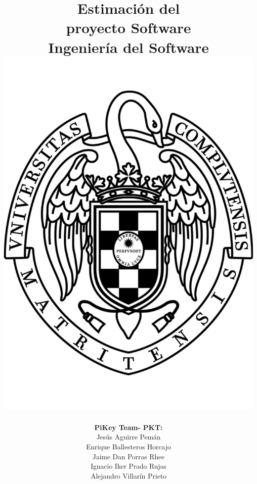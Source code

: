 \documentclass[spanish,a4paper,11pt, twoside]{report}	%
\begin{document}
\title{\textbf{\huge{ Estimación del \\ 
	proyecto Software}} \\ \vspace{0.3cm}
	\Large{Ingeniería del Software} \\
	\includegraphics[scale=0.3]{ucm.pdf}}
\author{ \textbf{\Large{PiKey Team- PKT:}} \vspace{0.2cm} \\
	Jesús Aguirre Pemán \\
	 Enrique Ballesteros Horcajo \\
	 Jaime Dan Porras Rhee \\
	 Ignacio Iker Prado Rujas \\
	 Alejandro Villarín Prieto }
\date{\Today}
\maketitle
\end{document}

